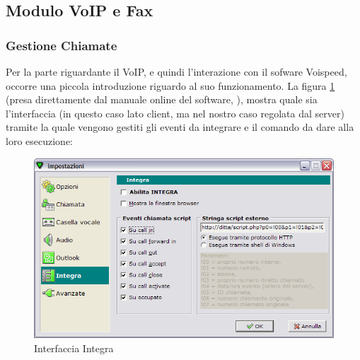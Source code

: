 \subsection{Modulo VoIP e Fax}
\subsubsection{Gestione Chiamate}
Per la parte riguardante il VoIP, e quindi l'interazione con il sofware Voispeed, occorre una piccola introduzione riguardo al suo funzionamento. La figura \ref{integra} (presa direttamente dal manuale online del software, \cite{voispeed}), mostra quale sia l'interfaccia (in questo caso lato client, ma nel nostro caso regolata dal server) tramite la quale vengono gestiti gli eventi da integrare e il comando da dare alla loro esecuzione: \\

\begin{figure}[!ht]
\centering
  \includegraphics[scale=0.6]{./images/voispeedoptions.png}
\caption{Interfaccia Integra}
\label{integra}
\end{figure}

